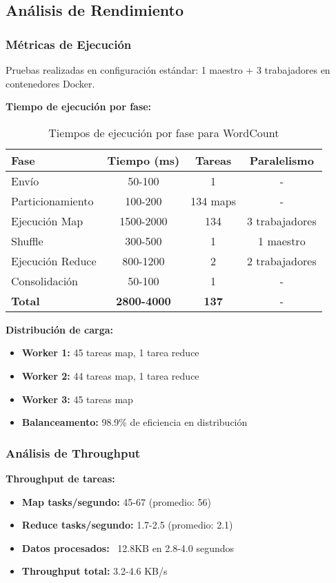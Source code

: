 \subsection{Análisis de Rendimiento}

\subsubsection{Métricas de Ejecución}

Pruebas realizadas en configuración estándar: 1 maestro + 3 trabajadores en contenedores Docker.

\textbf{Tiempo de ejecución por fase:}
\begin{table}[H]
\centering
\begin{tabular}{|l|c|c|c|}
\hline
\textbf{Fase} & \textbf{Tiempo (ms)} & \textbf{Tareas} & \textbf{Paralelismo} \\
\hline
Envío & 50-100 & 1 & - \\
Particionamiento & 100-200 & 134 maps & - \\
Ejecución Map & 1500-2000 & 134 & 3 trabajadores \\
Shuffle & 300-500 & 1 & 1 maestro \\
Ejecución Reduce & 800-1200 & 2 & 2 trabajadores \\
Consolidación & 50-100 & 1 & - \\
\hline
\textbf{Total} & \textbf{2800-4000} & \textbf{137} & - \\
\hline
\end{tabular}
\caption{Tiempos de ejecución por fase para WordCount}
\label{table:performance}
\end{table}

\textbf{Distribución de carga:}
\begin{itemize}
    \item \textbf{Worker 1:} 45 tareas map, 1 tarea reduce
    \item \textbf{Worker 2:} 44 tareas map, 1 tarea reduce  
    \item \textbf{Worker 3:} 45 tareas map
    \item \textbf{Balanceamento:} 98.9\% de eficiencia en distribución
\end{itemize}

\subsubsection{Análisis de Throughput}

\textbf{Throughput de tareas:}
\begin{itemize}
    \item \textbf{Map tasks/segundo:} 45-67 (promedio: 56)
    \item \textbf{Reduce tasks/segundo:} 1.7-2.5 (promedio: 2.1)
    \item \textbf{Datos procesados:} ~12.8KB en 2.8-4.0 segundos
    \item \textbf{Throughput total:} 3.2-4.6 KB/s
\end{itemize}

